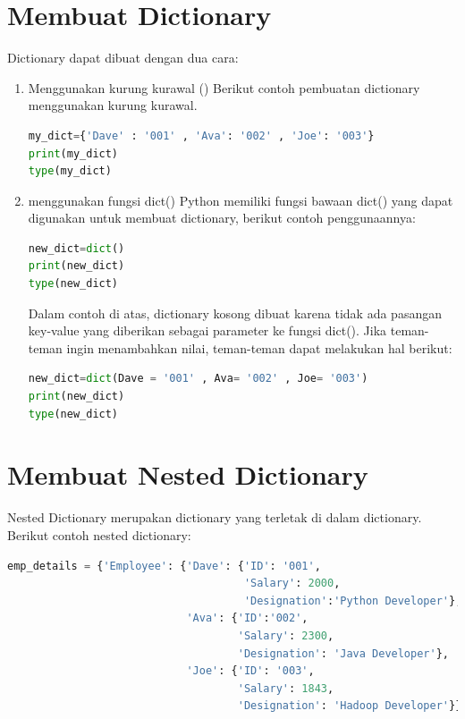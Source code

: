 \section{Membuat Dictionary}
Dictionary dapat dibuat dengan dua cara:
\begin{enumerate}
\item Menggunakan kurung kurawal ({})
Berikut contoh pembuatan dictionary menggunakan kurung kurawal.
\begin{lstlisting}[language=Python, caption=Dict dengan Kurung Kurawal]
my_dict={'Dave' : '001' , 'Ava': '002' , 'Joe': '003'}
print(my_dict)
type(my_dict)
\end{lstlisting}
\item menggunakan fungsi dict()
Python memiliki fungsi bawaan dict() yang dapat digunakan untuk membuat dictionary, berikut contoh penggunaannya:
\begin{lstlisting}[language=Python, caption=Dict dengan Kurung Kurawal]
new_dict=dict()
print(new_dict)
type(new_dict)
\end{lstlisting}
Dalam contoh di atas, dictionary kosong dibuat karena tidak ada pasangan key-value yang diberikan sebagai parameter ke fungsi dict(). Jika teman-teman ingin menambahkan nilai, teman-teman dapat melakukan hal berikut:
\begin{lstlisting}[language=Python, caption=Dict dengan Kurung Kurawal]
new_dict=dict(Dave = '001' , Ava= '002' , Joe= '003')
print(new_dict)
type(new_dict)
\end{lstlisting}
\end{enumerate}

\section{Membuat Nested Dictionary}
Nested Dictionary merupakan dictionary yang terletak di dalam dictionary. Berikut contoh nested dictionary:

\begin{lstlisting}[language=Python, caption=Nested Dict]
emp_details = {'Employee': {'Dave': {'ID': '001',
                                     'Salary': 2000,
                                     'Designation':'Python Developer'},
                            'Ava': {'ID':'002',
                                    'Salary': 2300,
                                    'Designation': 'Java Developer'},
                            'Joe': {'ID': '003',
                                    'Salary': 1843,
                                    'Designation': 'Hadoop Developer'}}}
\end{lstlisting}

